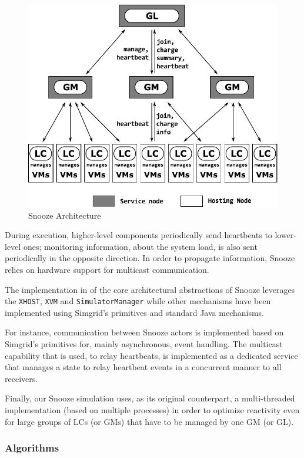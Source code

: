 \begin{figure}\centering
  \includegraphics[width=.9\linewidth]{figures/snooze/snoozearch.pdf}
  \caption{Snooze Architecture}
  \label{fig:snoozearch}
\end{figure}
During execution, higher-level components periodically send heartbeats
to lower-level ones; monitoring information, \eg about the system
load, is also sent periodically in the opposite direction. In order to
propagate information, Snooze relies on hardware support for multicast
communication.

The implementation in \vmps of the core architectural abstractions of
Snooze %
leverages the \texttt{XHOST}, \texttt{XVM} and
\texttt{SimulatorManager} while other mechanisms have been implemented
using Simgrid's primitives and standard Java mechanisms.

For instance, communication between Snooze actors is implemented based
on Simgrid's primitives for, mainly asynchronous, event handling.  The
multicast capability that is used, \eg to relay heartbeats, is
implemented as a dedicated service that manages a state to relay
heartbeat events in a concurrent manner to all receivers.

Finally, our Snooze simulation uses, as its original counterpart, a
multi-threaded implementation (\ie based on multiple \sg processes) in
order to optimize reactivity even for large groups of LCs (or GMs)
that have to be managed by one GM (or GL).

\subsubsection{Algorithms}
\label{sec:snoozeAlgs}

